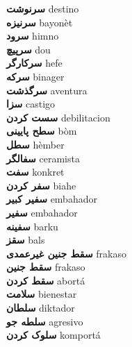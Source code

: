 \textbf{ سرنوشت  } destino \\
\textbf{ سرنیزه  } bayonèt \\
\textbf{ سرود  } himno \\
\textbf{ سرپیچ  } dou \\
\textbf{ سرکارگر  } hefe \\
\textbf{ سرکه  } binager \\
\textbf{ سرگذشت  } aventura \\
\textbf{ سزا  } castigo \\
\textbf{ سست کردن  } debilitacion \\
\textbf{ سطح پایینی  } bòm \\
\textbf{ سطل  } hèmber \\
\textbf{ سفالگر  } ceramista \\
\textbf{ سفت  } konkret \\
\textbf{ سفر کردن  } biahe \\
\textbf{ سفیر کبیر  } embahador \\
\textbf{ سفیر  } embahador \\
\textbf{ سفینه  } barku \\
\textbf{ سقز  } bals \\
\textbf{ سقط جنین غیرعمدی  } frakaso \\
\textbf{ سقط جنین  } frakaso \\
\textbf{ سقط کردن  } abortá \\
\textbf{ سلامت  } bienestar \\
\textbf{ سلطان  } diktador \\
\textbf{ سلطه جو  } agresivo \\
\textbf{ سلوک کردن  } komportá \\
